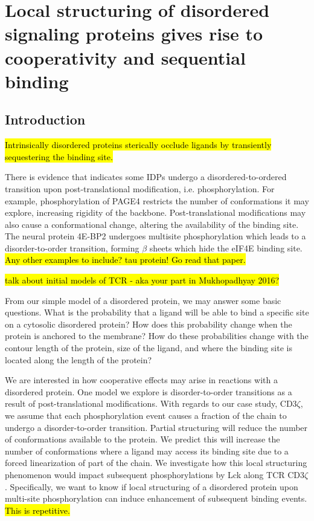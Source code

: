 \documentclass[../../AdvancementSummary.tex]{subfiles}
\begin{document}
\section{Local structuring of disordered signaling proteins gives rise to cooperativity and sequential binding}
\label{sec:LocalStruct}


\subsection{Introduction}

\hl{Intrinsically disordered proteins sterically occlude ligands by transiently sequestering the binding site.} 

There is evidence that indicates some IDPs undergo a disordered-to-ordered transition upon post-translational modification, i.e. phosphorylation. For example, phosphorylation of PAGE4 restricts the number of conformations it may explore, increasing rigidity of the backbone.\cite{He2015} Post-translational modifications may also cause a conformational change, altering the availability of the binding site.  The neural protein 4E-BP2 undergoes multisite phosphorylation which leads to a disorder-to-order transition, forming $\beta$ sheets which hide the eIF4E binding site. \cite{Bah2015} \hl{Any other examples to include? tau protein! Go read that paper.}

\hl{talk about initial models of TCR - aka your part in Mukhopadhyay 2016?}

From our simple model of a disordered protein, we may answer some basic questions.  What is the probability that a ligand will be able to bind a specific site on a cytosolic disordered protein?  How does this probability change when the protein is anchored to the membrane?  How do these probabilities change with the contour length of the protein, size of the ligand, and where the binding site is located along the length of the protein?

We are interested in how cooperative effects may arise in reactions with a disordered protein. One model we explore is disorder-to-order transitions as a result of post-translational modifications. With regards to our case study, CD3$\zeta$, we assume that each phosphorylation event causes a fraction of the chain to undergo a disorder-to-order transition. Partial structuring will reduce the number of conformations available to the protein. We predict this will increase the number of conformations where a ligand may access its binding site due to a forced linearization of part of the chain. We investigate how this local structuring phenomenon would impact subsequent phosphorylations by Lck along TCR CD3$\zeta$. Specifically, we want to know if local structuring of a disordered protein upon multi-site phosphorylation can induce enhancement of subsequent binding events. \hl{This is repetitive.}
\end{document}
